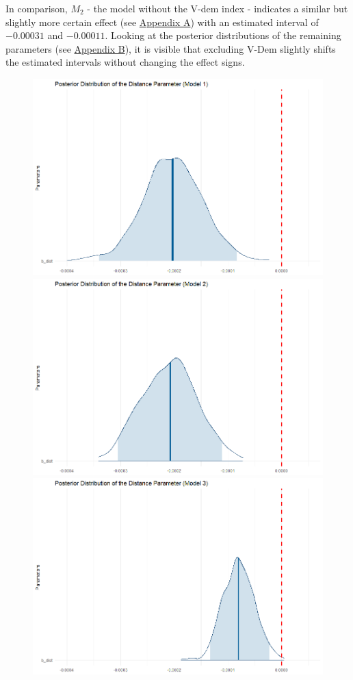 \documentclass[12pt,a4paper]{article}
\begin{document}
In comparison, $M_2$ - the model without the V-dem index -  indicates a similar but slightly more certain effect (see \hyperref[Appendix Tables]{\color{blue}Appendix A}) with an estimated interval of $-0.00031$ and $-0.00011$. Looking at the posterior distributions of the remaining parameters (see \hyperref[Appendix Figures]{\color{blue}Appendix B}), it is visible that excluding V-Dem slightly shifts the estimated intervals without changing the effect signs.

\begin{figure}[h]
\center
\label{F:5}
\includegraphics[scale=0.2]{PosteriorPlot_Distance_Model1.png}
\includegraphics[scale=0.2]{PosteriorPlot_Distance_Model2.png}
\includegraphics[scale=0.2]{PosteriorPlot_Distance_Model3.png}

\end{figure}
\end{document}
